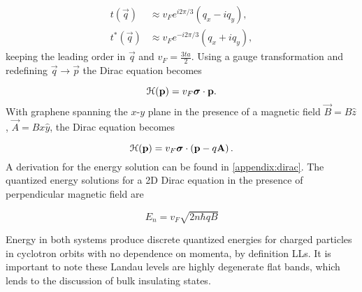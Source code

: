 \begin{align}
  t(\vec{q}) &\approx v_F e^{i 2\pi/3} \left(q_x - iq_y \right), \nonumber \\
  t^*(\vec{q}) &\approx v_F e^{-i 2\pi/3} \left(q_x + iq_y \right), \nonumber
\end{align}
keeping the leading order in $\vec{q}$ and $v_F = \tfrac{3ta}{2}$.
Using a gauge transformation and redefining $\vec{q} \rightarrow \vec{p}$ the Dirac equation becomes

\begin{equation}
  \mathcal{H}(\mathbf{p}) = v_F \bm{\sigma}\cdot \mathbf{p}.
\end{equation}
With graphene spanning the $x$-$y$ plane in the presence of a magnetic field $\vec{B} = B\hat{z}$, $\vec{A} =  Bx\hat{y}$, the Dirac equation becomes

\begin{equation}
  \mathcal{H}(\mathbf{p}) = v_F \bm{\sigma}\cdot \left(\mathbf{p} - q\mathbf{A} \right).
\end{equation}
A derivation for the energy solution can be found in \ref{appendix:dirac}.
The quantized energy solutions for a 2D Dirac equation in the presence of perpendicular magnetic field are

\begin{equation}
  E_n = v_F \sqrt{2 n \hbar qB }
\end{equation}

Energy in both systems produce discrete quantized energies for charged particles in cyclotron orbits with no dependence on momenta, by definition LLs.
It is important to note these Landau levels are highly degenerate flat bands, which lends to the discussion of bulk insulating states.

